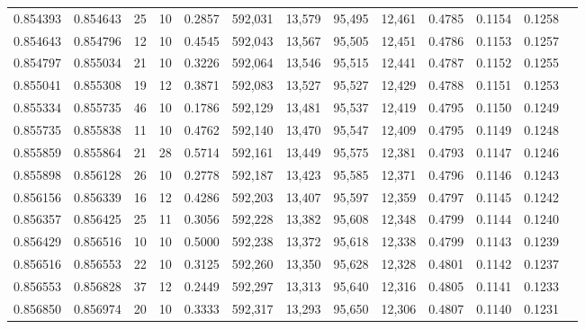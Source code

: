 \begin{tabular}{rrrrrrrrrrrrr}
0.854393 & 0.854643 &    25 &  10 &                                     0.2857 & 592,031 &  13,579 &  95,495 &  12,461 & 0.4785 & 0.1154 & 0.1258 \\
0.854643 & 0.854796 &    12 &  10 &                                     0.4545 & 592,043 &  13,567 &  95,505 &  12,451 & 0.4786 & 0.1153 & 0.1257 \\
0.854797 & 0.855034 &    21 &  10 &                                     0.3226 & 592,064 &  13,546 &  95,515 &  12,441 & 0.4787 & 0.1152 & 0.1255 \\
0.855041 & 0.855308 &    19 &  12 &                                     0.3871 & 592,083 &  13,527 &  95,527 &  12,429 & 0.4788 & 0.1151 & 0.1253 \\
0.855334 & 0.855735 &    46 &  10 &                                     0.1786 & 592,129 &  13,481 &  95,537 &  12,419 & 0.4795 & 0.1150 & 0.1249 \\
0.855735 & 0.855838 &    11 &  10 &                                     0.4762 & 592,140 &  13,470 &  95,547 &  12,409 & 0.4795 & 0.1149 & 0.1248 \\
0.855859 & 0.855864 &    21 &  28 &                                     0.5714 & 592,161 &  13,449 &  95,575 &  12,381 & 0.4793 & 0.1147 & 0.1246 \\
0.855898 & 0.856128 &    26 &  10 &                                     0.2778 & 592,187 &  13,423 &  95,585 &  12,371 & 0.4796 & 0.1146 & 0.1243 \\
0.856156 & 0.856339 &    16 &  12 &                                     0.4286 & 592,203 &  13,407 &  95,597 &  12,359 & 0.4797 & 0.1145 & 0.1242 \\
0.856357 & 0.856425 &    25 &  11 &                                     0.3056 & 592,228 &  13,382 &  95,608 &  12,348 & 0.4799 & 0.1144 & 0.1240 \\
0.856429 & 0.856516 &    10 &  10 &                                     0.5000 & 592,238 &  13,372 &  95,618 &  12,338 & 0.4799 & 0.1143 & 0.1239 \\
0.856516 & 0.856553 &    22 &  10 &                                     0.3125 & 592,260 &  13,350 &  95,628 &  12,328 & 0.4801 & 0.1142 & 0.1237 \\
0.856553 & 0.856828 &    37 &  12 &                                     0.2449 & 592,297 &  13,313 &  95,640 &  12,316 & 0.4805 & 0.1141 & 0.1233 \\
0.856850 & 0.856974 &    20 &  10 &                                     0.3333 & 592,317 &  13,293 &  95,650 &  12,306 & 0.4807 & 0.1140 & 0.1231 \\

\end{tabular}

